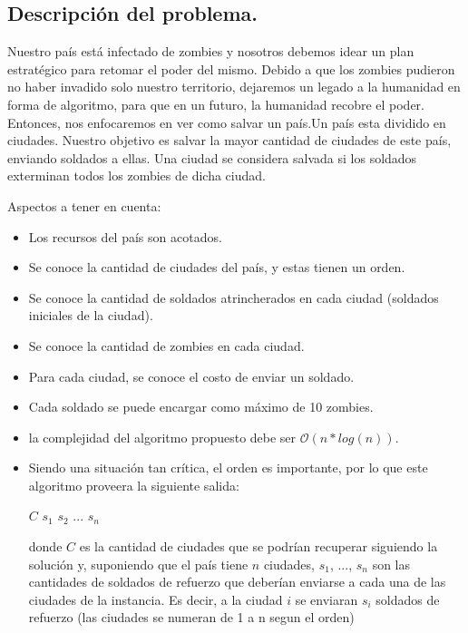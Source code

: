 \subsection{Descripción del problema.}

\vspace*{0.3cm}

Nuestro país está infectado de zombies y nosotros debemos idear un plan estratégico para retomar el poder del mismo. Debido a que los zombies pudieron no haber invadido solo nuestro territorio, dejaremos un legado a la humanidad en forma de algoritmo, para que en un futuro, la humanidad recobre el poder.
Entonces, nos enfocaremos en ver como salvar un país.Un país esta dividido en ciudades. Nuestro objetivo es salvar la mayor cantidad de ciudades de este país, enviando soldados a ellas. Una ciudad se considera salvada si los soldados exterminan todos los zombies de dicha ciudad.

Aspectos a tener en cuenta:

\begin{itemize}
   \item Los recursos del país son acotados.
   \item Se conoce la cantidad de ciudades del país, y estas tienen un orden.
   \item Se conoce la cantidad de soldados atrincherados en cada ciudad (soldados iniciales de la ciudad).
   \item Se conoce la cantidad de zombies en cada ciudad.
   \item Para cada ciudad, se conoce el costo de enviar un soldado.
   \item Cada soldado se puede encargar como máximo de 10 zombies.
   \item la complejidad del algoritmo propuesto debe ser $\mathcal{O}(n*log(n))$.
	\item Siendo una situación tan crítica, el orden es importante, por lo que este algoritmo proveera la siguiente salida:

$C$ $s_{1}$ $s_{2}$ ... $s_{n}$

donde $C$ es la cantidad de ciudades que se podrían recuperar siguiendo la solución y, suponiendo que el país tiene $n$ ciudades, $s_{1}$, ..., $s_{n}$ son las cantidades de soldados de refuerzo que deberían enviarse a cada una de las ciudades de la instancia. Es decir, a la ciudad $i$ se enviaran $s_{i}$ soldados de refuerzo (las ciudades se numeran de 1 a n segun el orden)
\end{itemize}


